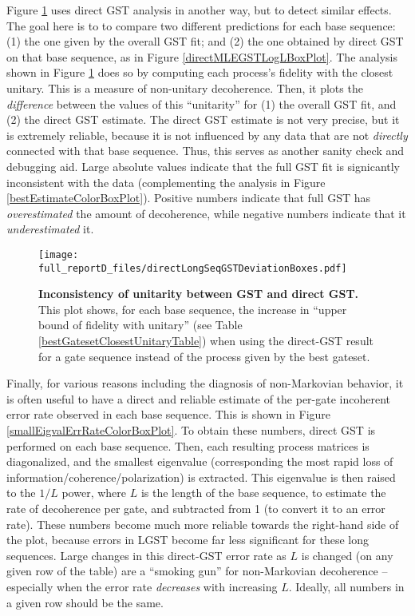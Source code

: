 {Figure \ref{directMLEGSTDeviationBoxPlot} uses direct GST analysis in another way, but to detect similar effects.   The goal here is to to compare two different predictions for each base sequence:  (1) the one given by the overall GST fit; and (2) the one obtained by direct GST on that base sequence, as in Figure \ref{directMLEGSTLogLBoxPlot}.  The analysis shown in Figure \ref{directMLEGSTDeviationBoxPlot} does so by computing each process's fidelity with the closest unitary.  This is a measure of non-unitary decoherence.  Then, it plots the \emph{difference} between the values of this ``unitarity'' for (1) the overall GST fit, and (2) the direct GST estimate.  The direct GST estimate is not very precise, but it is extremely reliable, because it is not influenced by any data that are not \emph{directly} connected with that base sequence.  Thus, this serves as another sanity check and debugging aid.  Large absolute values indicate that the full GST fit is signicantly inconsistent with the data (complementing the analysis in Figure \ref{bestEstimateColorBoxPlot}).  Positive numbers indicate that full GST has \emph{overestimated} the amount of decoherence, while negative numbers indicate that it \emph{underestimated} it.

\begin{figure}
\begin{center}
\texttt{[image: full\_reportD\_files/directLongSeqGSTDeviationBoxes.pdf]}
\caption{\textbf{Inconsistency of unitarity between GST and direct GST.}  This plot shows, for each base sequence, the increase in ``upper bound of fidelity with unitary'' (see Table \ref{bestGatesetClosestUnitaryTable}) when using the direct-GST result for a gate sequence instead of the process given by the best gateset.\label{directMLEGSTDeviationBoxPlot}}
\end{center}
\end{figure}

Finally, for various reasons including the diagnosis of non-Markovian behavior, it is often useful to have a direct and reliable estimate of the per-gate incoherent error rate observed in each base sequence.  This is shown in Figure \ref{smallEigvalErrRateColorBoxPlot}.  To obtain these numbers, direct GST is performed on each base sequence.  Then, each resulting process matrices is diagonalized, and the smallest eigenvalue (corresponding the most rapid loss of information/coherence/polarization) is extracted.  This eigenvalue is then raised to the $1/L$ power, where $L$ is the length of the base sequence, to estimate the rate of decoherence per gate, and subtracted from 1 (to convert it to an error rate).  These numbers become much more reliable towards the right-hand side of the plot, because errors in LGST become far less significant for these long sequences.  Large changes in this direct-GST error rate as $L$ is changed (on any given row of the table) are a ``smoking gun'' for non-Markovian decoherence -- especially when the error rate \emph{decreases} with increasing $L$.  Ideally, all numbers in a given row should be the same.

}
